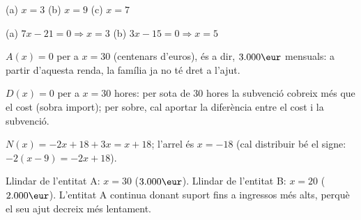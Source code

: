 \begin{solucions}
\begin{sollist}
  \item (a) $x=3$ \quad (b) $x=9$ \quad (c) $x=7$
  \item (a) $7x-21=0 \Rightarrow x=3$ \quad
        (b) $3x-15=0 \Rightarrow x=5$
  \item $A(x)=0$ per a $x=30$ (centenars d'euros), és a dir, $3.000\eur$
        mensuals: a partir d'aquesta renda, la família ja no té dret a
        l'ajut.
  \item $D(x)=0$ per a $x=30$ hores: per sota de $30$ hores la subvenció
        cobreix més que el cost (sobra import); per sobre, cal aportar la
        diferència entre el cost i la subvenció.
  \item $N(x)=-2x+18+3x=x+18$; l'arrel és $x=-18$ (cal distribuir bé el
        signe: $-2(x-9)=-2x+18$).
  \item Llindar de l'entitat A: $x=30$ ($3.000\eur$). Llindar de
        l'entitat B: $x=20$ ($2.000\eur$). L'entitat A continua donant
        suport fins a ingressos més alts, perquè el seu ajut decreix més
        lentament.
\end{sollist}
\end{solucions}
